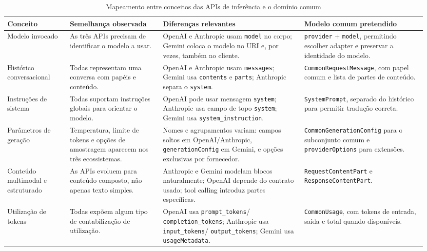 \documentclass[11pt,a4paper]{report}
\begin{document}
    \begin{table}[H]
        \centering
        \footnotesize
        \renewcommand{\arraystretch}{1.25}
        \begin{tabularx}{\textwidth}{|>{\raggedright\arraybackslash}p{2.5cm}|Y|Y|Y|}
            \hline
            \textbf{Conceito} & \textbf{Semelhança observada} & \textbf{Diferenças relevantes} & \textbf{Modelo comum pretendido} \\
            \hline
            Modelo invocado & As três APIs precisam de identificar o modelo a usar. & OpenAI e Anthropic usam \texttt{model} no corpo; Gemini coloca o modelo no URI e, por vezes, também no cliente. & \texttt{provider} + \texttt{model}, permitindo escolher adapter e preservar a identidade do modelo. \\
            \hline
            Histórico conversacional & Todas representam uma conversa com papéis e conteúdo. & OpenAI e Anthropic usam \texttt{messages}; Gemini usa \texttt{contents} e \texttt{parts}; Anthropic separa o \texttt{system}. & \texttt{CommonRequestMessage}, com papel comum e lista de partes de conteúdo. \\
            \hline
            Instruções de sistema & Todas suportam instruções globais para orientar o modelo. & OpenAI pode usar mensagem \texttt{system}; Anthropic usa campo de topo \texttt{system}; Gemini usa \texttt{system\_instruction}. & \texttt{SystemPrompt}, separado do histórico para permitir tradução correta. \\
            \hline
            Parâmetros de geração & Temperatura, limite de tokens e opções de amostragem aparecem nos três ecossistemas. & Nomes e agrupamentos variam: campos soltos em OpenAI/Anthropic, \texttt{generationConfig} em Gemini, e opções exclusivas por fornecedor. & \texttt{CommonGenerationConfig} para o subconjunto comum e \texttt{providerOptions} para extensões. \\
            \hline
            Conteúdo multimodal e estruturado & As APIs evoluem para conteúdo composto, não apenas texto simples. & Anthropic e Gemini modelam blocos naturalmente; OpenAI depende do contrato usado; tool calling introduz partes específicas. & \texttt{RequestContentPart} e \texttt{ResponseContentPart}. \\
            \hline
            Utilização de tokens & Todas expõem algum tipo de contabilização de utilização. & OpenAI usa \texttt{prompt\_tokens}/
            \texttt{completion\_tokens}; Anthropic usa \texttt{input\_tokens}/
            \texttt{output\_tokens}; Gemini usa \texttt{usageMetadata}. & \texttt{CommonUsage}, com tokens de entrada, saída e total quando disponíveis. \\
            \hline
        \end{tabularx}
        \caption{Mapeamento entre conceitos das APIs de inferência e o domínio comum}
        \label{tab:api-domain-mapping}
    \end{table}
\end{document}
